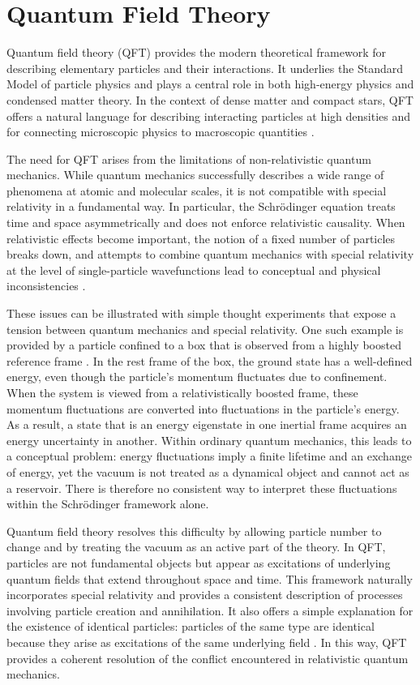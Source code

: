 \chapter{Quantum Field Theory}
\label{chap:qft}

Quantum field theory (QFT) provides the modern theoretical framework for
describing elementary particles and their interactions. It underlies the
Standard Model of particle physics and plays a central role in both
high-energy physics and condensed matter theory. 
In the context of dense matter and compact stars, QFT offers
a natural language for describing interacting particles at high densities and
for connecting microscopic physics to macroscopic quantities
\cite{PeskinSchroeder1995,Weinberg1995}.

The need for QFT arises from the limitations of
non-relativistic quantum mechanics. While quantum mechanics successfully
describes a wide range of phenomena at atomic and molecular scales, it is not
compatible with special relativity in a fundamental way. In particular, the
Schrödinger equation treats time and space asymmetrically and does not enforce
relativistic causality. When relativistic effects become important, the notion
of a fixed number of particles breaks down, and attempts to combine quantum
mechanics with special relativity at the level of single-particle wavefunctions
lead to conceptual and physical inconsistencies
\cite{BjorkenDrell1964}.

These issues can be illustrated with simple thought experiments that expose a
tension between quantum mechanics and special relativity. One such
example is provided by a particle confined to a box that is observed from a
highly boosted reference frame \cite{Vutha_2013}. In the rest frame of the box,
the ground state has a well-defined energy, even though the particle’s momentum
fluctuates due to confinement. When the system is viewed from a relativistically
boosted frame, these momentum fluctuations are converted into fluctuations in
the particle’s energy. As a result, a state that is an energy eigenstate in one
inertial frame acquires an energy uncertainty in another. Within ordinary
quantum mechanics, this leads to a conceptual problem: energy fluctuations imply
a finite lifetime and an exchange of energy, yet the vacuum is not treated as a
dynamical object and cannot act as a reservoir. There is therefore no consistent
way to interpret these fluctuations within the Schrödinger framework alone.

Quantum field theory resolves this difficulty by allowing particle number to
change and by treating the vacuum as an active part of the theory. In QFT,
particles are not fundamental objects but appear as excitations of underlying
quantum fields that extend throughout space and time. This framework naturally
incorporates special relativity and provides a consistent description of
processes involving particle creation and annihilation. It also offers a simple
explanation for the existence of identical particles: particles of the same type
are identical because they arise as excitations of the same underlying field
\cite{Weinberg1995}. In this way, QFT provides a coherent resolution of the
conflict encountered in relativistic quantum mechanics.


